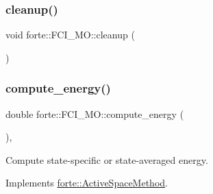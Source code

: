 \subsubsection{\texorpdfstring{cleanup()}{cleanup()}}
{\footnotesize\ttfamily void forte\+::\+F\+C\+I\+\_\+\+M\+O\+::cleanup (\begin{DoxyParamCaption}{ }\end{DoxyParamCaption})\hspace{0.3cm}{\ttfamily [protected]}}

\mbox{\label{classforte_1_1_f_c_i___m_o_a98d9b947e1cf345c82d513a54ca51ddd}} 
\subsubsection{\texorpdfstring{compute\+\_\+energy()}{compute\_energy()}}
{\footnotesize\ttfamily double forte\+::\+F\+C\+I\+\_\+\+M\+O\+::compute\+\_\+energy (\begin{DoxyParamCaption}{ }\end{DoxyParamCaption})\hspace{0.3cm}{\ttfamily [override]}, {\ttfamily [virtual]}}



Compute state-\/specific or state-\/averaged energy. 



Implements \mbox{\hyperlink{classforte_1_1_active_space_method_a99736e2b94405371b224b0750569b077}{forte\+::\+Active\+Space\+Method}}.

\mbox{\label{classforte_1_1_f_c_i___m_o_aa386ce9ea4166adf02c9a5ae57f0e7a9}} 

